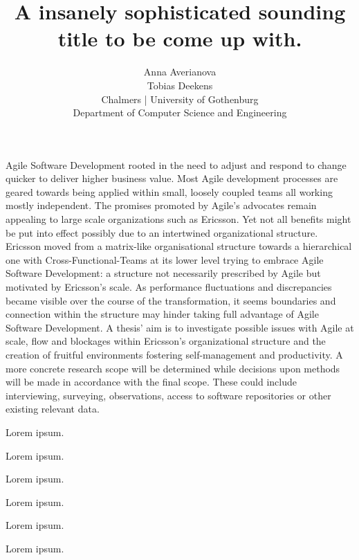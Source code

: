 \documentclass[times, 10pt,twocolumn]{article}
\begin{document}
	\title{A insanely sophisticated sounding title to be come up with.}

	\author{Anna Averianova\\
		Tobias Deekens\\
		Chalmers | University of Gothenburg\\
		Department of Computer Science and Engineering\\
	}

	\maketitle
	\thispagestyle{empty}


	Agile Software Development rooted in the need to adjust and respond to change quicker to deliver higher business value. Most Agile development processes are geared towards being applied within small, loosely coupled teams all working mostly independent. The promises promoted by Agile’s advocates remain appealing to large scale organizations such as Ericsson. Yet not all benefits might be put into effect possibly due to an intertwined organizational structure.
   Ericsson moved from a matrix-like organisational structure towards a hierarchical one with Cross-Functional-Teams at its lower level trying to embrace Agile Software Development: a structure not necessarily prescribed by Agile but motivated by Ericsson’s scale. As performance fluctuations and discrepancies became visible over the course of the transformation, it seems boundaries and connection within the structure may hinder taking full advantage of Agile Software Development.
   A thesis’ aim is to investigate possible issues with Agile at scale, flow and blockages within Ericsson’s organizational structure and the creation of fruitful environments fostering self-management and productivity. A more concrete research scope will be determined while decisions upon methods will be made in accordance with the final scope. These could include interviewing, surveying, observations, access to software repositories or other existing relevant data.


	Lorem ipsum.
	

	Lorem ipsum.
	

	Lorem ipsum.
	

	Lorem ipsum.
	

	Lorem ipsum.
	

	Lorem ipsum.

	
	
\end{document}
